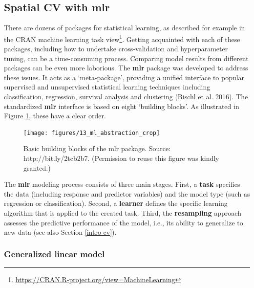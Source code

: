 \documentclass[]{krantz}
\let\rmarkdownfootnote\footnote%
\def\footnote{\protect\rmarkdownfootnote}
\renewcommand{\href}[2]{#2\footnote{\url{#1}}}
\begin{document}
\hypertarget{spatial-cv-with-mlr}{%
\subsection{\texorpdfstring{Spatial CV with \textbf{mlr}}{Spatial CV with mlr}}\label{spatial-cv-with-mlr}}

There are dozens of packages for statistical learning, as described for example in the \href{https://CRAN.R-project.org/view=MachineLearning}{CRAN machine learning task view}.
Getting acquainted with each of these packages, including how to undertake cross-validation and hyperparameter tuning, can be a time-consuming process.
Comparing model results from different packages can be even more laborious.
The \textbf{mlr} package was developed to address these issues.
It acts as a `meta-package', providing a unified interface to popular supervised and unsupervised statistical learning techniques including classification, regression, survival analysis and clustering (Bischl et al. \protect\hyperlink{ref-bischl_mlr:_2016}{2016}).
The standardized \textbf{mlr} interface is based on eight `building blocks'.
As illustrated in Figure \ref{fig:building-blocks}, these have a clear order.

\begin{figure}[t]

{\centering \texttt{[image: figures/13\_ml\_abstraction\_crop]} 

}

\caption[Basic building blocks of the mlr package.]{Basic building blocks of the mlr package. Source: http://bit.ly/2tcb2b7. (Permission to reuse this figure was kindly granted.)}\label{fig:building-blocks}
\end{figure}

The \textbf{mlr} modeling process consists of three main stages.
First, a \textbf{task} specifies the data (including response and predictor variables) and the model type (such as regression or classification).
Second, a \textbf{learner} defines the specific learning algorithm that is applied to the created task.
Third, the \textbf{resampling} approach assesses the predictive performance of the model, i.e., its ability to generalize to new data (see also Section \ref{intro-cv}).

\hypertarget{glm}{%
\subsubsection{Generalized linear model}\label{glm}}
\end{document}
